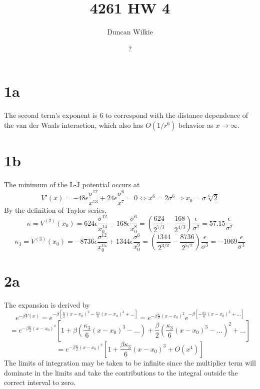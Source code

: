 \documentclass{article}
\title{4261 HW 4}
\author{Duncan Wilkie}
\date{?}
\begin{document}
\maketitle

\section*{1a}
The second term's exponent is 6 to correspond with the distance dependence of the van der Waals interaction, which also has $O(1/r^6)$
behavior as $x\to\infty$.
\section*{1b}
The minimum of the L-J potential occurs at
\[
  V'(x)=-48\epsilon\frac{\sigma^{12}}{x^{13}}+24\epsilon\frac{\sigma^{6}}{x^{7}}=0
  \Leftrightarrow x^{6}=2{\sigma^{6}}
  \Rightarrow x_{0}=\sigma \sqrt[6]{2}
\]
By the definition of Taylor series,
\[
  \kappa=V^{(2)}(x_{0})=624\epsilon\frac{\sigma^{12}}{x_{0}^{14}}-168\epsilon\frac{\sigma^{6}}{x_{0}^{8}}
  =\left(\frac{624}{2^{7/3}}-\frac{168}{2^{4/3}}\right)\frac{\epsilon}{\sigma^{2}}=57.15\frac{\epsilon}{\sigma^{2}}
\]
\[
  \kappa_{3}=V^{(3)}(x_{0})=-8736\epsilon\frac{\sigma^{12}}{x_{0}^{15}}+1344\epsilon\frac{\sigma^{6}}{x_{0}^{9}}
  =\left( \frac{1344}{2^{3/2}}-\frac{8736}{2^{5/2}}\right)\frac{\epsilon}{\sigma^{3}}=-1069\frac{\epsilon}{\sigma^{3}}
\]

\section*{2a}
The expansion is derived by
\[
  e^{-\beta V(x)}=e^{-\beta \left[ \frac{\kappa}{2}(x-x_{0})^{2}-\frac{\kappa_{3}}{6}(x-x_{0})^{3}+... \right]}
  =e^{-\beta\frac{\kappa}{2}(x-x_{0})^{2}}e^{-\beta\left[ -\frac{\kappa_{3}}{6}(x-x_{0})^{3}+... \right]}
\]
\[
  =e^{-\beta\frac{\kappa}{2}(x-x_{0})^{2}}
  \left[ 1+\beta(\frac{\kappa_{3}}{6}(x-x_{0})^{3}-...)+\frac{\beta}{2}(\frac{\kappa_{3}}{6}(x-x_{0})^{3}-...)^{2} +...\right]
\]
\[
  =e^{-\beta\frac{\kappa}{2}(x-x_{0})^{2}}\left[ 1+\frac{\beta\kappa_{3}}{6}(x-x_{0})^{3}+O(x^{4}) \right]
\]
The limits of integration may be taken to be infinite since the multiplier term will dominate in the limits and take the
contributions to the integral outside the correct interval to zero.
\end{document}
